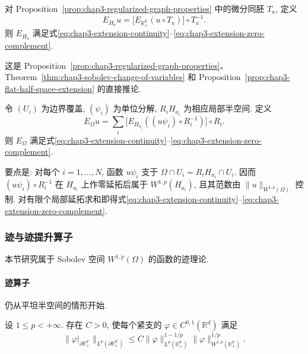 \begin{Proposition}
\label{prop:chap3-lipschitz-half-space-extension}
对 Proposition~\ref{prop:chap3-regularized-graph-properties} 中的微分同胚 $T_a$, 定义
\[
 E_{H_a}u=\bigl[E_{\mathbb R_+^d}(u\circ T_a)\bigr]\circ T_a^{-1}.
\]
则 $E_{H_a}$ 满足式\eqref{eq:chap3-extension-continuity}--\eqref{eq:chap3-extension-zero-complement}.
\end{Proposition}

\begin{Proof}
这是 Proposition~\ref{prop:chap3-regularized-graph-properties}、Theorem~\ref{thm:chap3-sobolev-change-of-variables} 和 Proposition~\ref{prop:chap3-flat-half-space-extension} 的直接推论.
\end{Proof}

\begin{Theorem}
\label{thm:chap3-global-lipschitz-extension}
令 $(U_i)$ 为边界覆盖, $(\psi_i)$ 为单位分解, $R_iH_{a_i}$ 为相应局部半空间. 定义
\[
 E_\Omega u=\sum_i\bigl[E_{H_{a_i}}((u\psi_i)\circ R_i^{-1})\bigr]\circ R_i.
\]
则 $E_\Omega$ 满足式\eqref{eq:chap3-extension-continuity}--\eqref{eq:chap3-extension-zero-complement}.
\end{Theorem}

\begin{Proof}
要点是: 对每个 $i=1,\ldots,N$, 函数 $u\psi_i$ 支于 $\Omega\cap U_i=R_iH_{a_i}\cap U_i$. 因而 $(u\psi_i)\circ R_i^{-1}$ 在 $H_{a_i}$ 上作零延拓后属于 $W^{1,p}(H_{a_i})$, 且其范数由 $\|u\|_{W^{1,p}(\Omega)}$ 控制. 对有限个局部延拓求和即得式\eqref{eq:chap3-extension-continuity}--\eqref{eq:chap3-extension-zero-complement}.
\end{Proof}

\subsubsection{迹与迹提升算子}
\label{subsec:chap3-trace-lifting}

本节研究属于 Sobolev 空间 $W^{1,p}(\Omega)$ 的函数的迹理论.

\paragraph{迹算子}

仍从平坦半空间的情形开始.

\begin{Proposition}
\label{prop:chap3-flat-trace-inequality}
设 $1\leq p<+\infty$. 存在 $C>0$, 使每个紧支的 $\varphi\in C^{0,1}(\mathbb R^d)$ 满足
\[
 \|\varphi|_{\partial\mathbb R_+^d}\|_{L^p(\partial\mathbb R_+^d)}
 \leq C\|\varphi\|_{L^p(\mathbb R_+^d)}^{1-1/p}
 \|\varphi\|_{W^{1,p}(\mathbb R_+^d)}^{1/p}.
\]
\end{Proposition}


